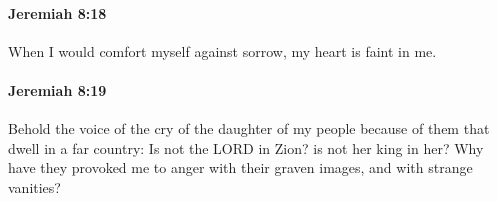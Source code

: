 		\paragraph{Jeremiah 8:18} %
			\label{JEREMIAH-8-18}

			When I would comfort myself against sorrow, my heart is faint in me.


		\paragraph{Jeremiah 8:19} %
			\label{JEREMIAH-8-19}

			Behold the voice of the cry of the daughter of my people because of them that dwell in a far country: Is not the LORD in Zion? is not her king in her? Why have they provoked me to anger with their graven images, and with strange vanities?



